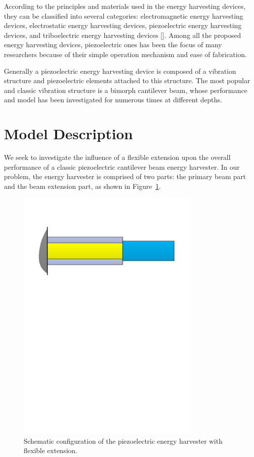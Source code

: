 \documentclass{elsarticle}
\begin{document}
According to the principles and materials used in the energy harvesting devices, they can be classified into several categories: electromagnetic energy harvesting devices, electrostatic energy harvesting devices, piezoelectric energy harvesting devices, and triboelectric energy harvesting devices []. Among all the proposed energy harvesting devices, piezoelectric ones has been the focus of many researchers because of their simple operation mechanism and ease of fabrication. 

Generally a piezoelectric energy harvesting device is composed of a vibration structure and piezoelectric elements attached to this structure. The most popular and classic vibration structure is a bimorph cantilever beam, whose performance and model has been investigated for numerous times at different depths. 



\section{Model Description}

We seek to investigate the influence of a flexible extension upon the overall performance of a classic piezoelectric cantilever beam energy harvester. In our problem, the energy harvester is comprised of two parts: the primary beam part and the beam extension part, as shown in Figure~\ref{fig:fig_beam_configuration}.
\begin{figure}[!htbp]
    \centering
    \includegraphics[width=0.8\textwidth]{./fig_beam_configuration.pdf}
    \caption{Schematic configuration of the piezoelectric energy harvester with flexible extension.}
    \label{fig:fig_beam_configuration}
\end{figure}
\end{document}
